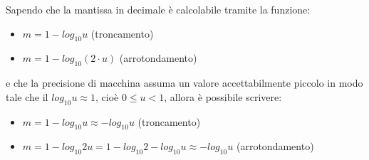 Sapendo che la mantissa in decimale è calcolabile tramite la funzione:
\begin{itemize}
\item \( m = 1- log_{10}{u} \) (troncamento) 
\item \( m = 1- log_{10}{(2\cdot u)} \) (arrotondamento)
\end{itemize}
e che la precisione di macchina assuma un valore accettabilmente piccolo in modo tale che il \(log_{10}{u} \approx 1\), cioè $0\leq u<1$, allora è possibile scrivere:
\begin{itemize}
\item \( m = 1 - log_{10}{u} \approx -log_{10}{u} \) (troncamento)
\item \( m = 1 - log_{10}{2u} = 1 - log_{10}{2} - log_{10}{u} \approx -log_{10}{u} \) (arrotondamento)
\end{itemize}